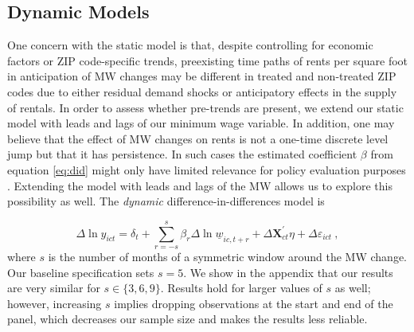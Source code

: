 \subsection{Dynamic Models}

One concern with the static model is that, despite controlling for economic factors or ZIP 
code-specific trends, preexisting time paths of rents per square foot in anticipation of MW 
changes may be different in treated and non-treated ZIP codes due to either residual demand 
shocks or anticipatory effects in the supply of rentals. In order to assess whether pre-trends 
are present, we extend our static model with leads and lags of our minimum wage variable. 
In addition, one may believe that the effect of MW changes on rents is not a one-time discrete 
level jump but that it has persistence. In such cases the estimated coefficient $\beta$ from 
equation \eqref{eq:did} might only have limited relevance for policy evaluation purposes 
\parencite{callaway2019}. Extending the model with leads and lags of the MW allows us to 
explore this possibility as well. The \textit{dynamic} difference-in-differences model is

\begin{equation} \label{eq:leads_lags}
	\Delta \ln y_{ict} = \delta_t
						+ \sum_{r=-s}^{s} \beta_r \Delta \ln \underline{w}_{ic,t+r}
						+ \Delta \mathbf{X}^{'}_{ct}\eta
						+ \Delta \varepsilon_{ict} \ ,
\end{equation}
where $s$ is the number of months of a symmetric window around the MW change. Our baseline
specification sets $s = 5$. We show in the appendix that our results are very similar for
$s \in \{3, 6, 9\}$. Results hold for larger values of $s$ as well; however, increasing 
$s$ implies dropping observations at the start and end of the panel, which decreases our 
sample size and makes the results less reliable.

